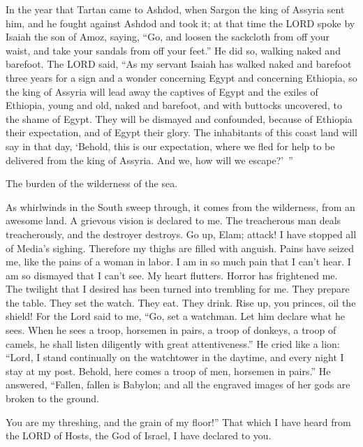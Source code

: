 \mychapter{} \myverse*{}In the year that Tartan came to Ashdod, when Sargon the king of
Assyria sent him, and he fought against Ashdod and took it;
\myverse{}at that time the LORD spoke by Isaiah the son of Amoz, saying, “Go, and loosen
the sackcloth from off your waist, and take your sandals from off your feet.” He did so, walking naked
and barefoot.
\myverse{}The LORD said, “As my servant Isaiah has walked naked and barefoot three years
for a sign and a wonder concerning Egypt and concerning Ethiopia,
\myverse{}so the king of Assyria will lead away the captives of Egypt and the exiles
of Ethiopia, young and old, naked and barefoot, and with buttocks uncovered, to the shame of Egypt.
\myverse{}They will be dismayed and confounded, because of Ethiopia their expectation,
and of Egypt their glory.
\myverse{}The inhabitants of this coast land will say in that day, ‘Behold, this is our
expectation, where we fled for help to be delivered from the king of Assyria. And we, how will we escape?’ ”


\mychapter{} \myverse*{}The burden of the wilderness of the sea.

\quad\quad As whirlwinds in the South sweep through, it comes from the wilderness, from an awesome land.
\myverse{}A grievous vision is declared to me. The treacherous man deals treacherously,
and the destroyer destroys. Go up, Elam; attack! I have stopped all of Media’s sighing.
\myverse{}Therefore my thighs are filled with anguish. Pains have seized me, like the
pains of a woman in labor. I am in so much pain that I can’t hear. I am so dismayed that I can’t see.
\myverse{}My heart flutters. Horror has frightened me. The twilight that I desired has
been turned into trembling for me.
\myverse{}They prepare the table. They set the watch. They eat. They drink. Rise up,
you princes, oil the shield!
\myverse{}For the Lord said to me, “Go, set a watchman. Let him declare what he sees.
\myverse{}When he sees a troop, horsemen in pairs, a troop of donkeys, a troop of camels,
he shall listen diligently with great attentiveness.”
\myverse{}He cried like a lion: “Lord, I stand continually on the watchtower in the daytime,
and every night I stay at my post.
\myverse{}Behold, here comes a troop of men, horsemen in pairs.” He answered, “Fallen,
fallen is Babylon; and all the engraved images of her gods are broken to the ground.

\myverse{}You are my threshing, and the grain of my floor!” That which
I have heard from the LORD of Hosts, the God of Israel, I have declared to you.

